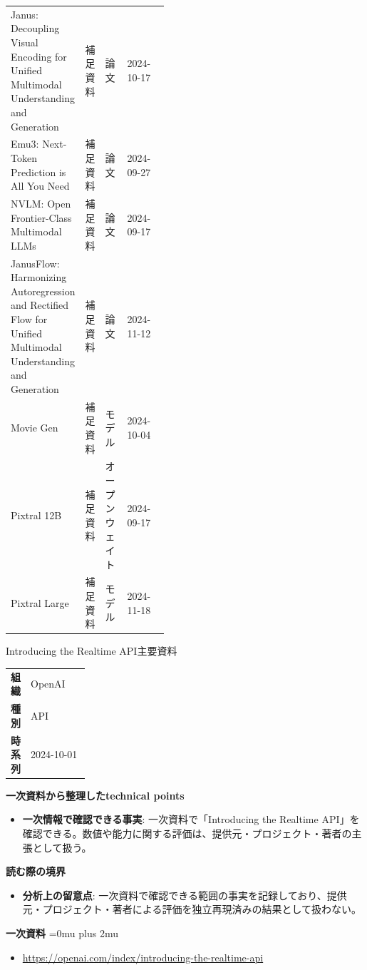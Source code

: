 \begin{center}
\begin{tabularx}{\linewidth}{@{}p{0.20\linewidth}p{0.10\linewidth}p{0.14\linewidth}X@{}}
Janus: Decoupling Visual Encoding for Unified Multimodal Understanding and Generation & 補足資料 & 論文 & 2024-10-17   \\
Emu3: Next-Token Prediction is All You Need & 補足資料 & 論文 & 2024-09-27   \\
NVLM: Open Frontier-Class Multimodal LLMs & 補足資料 & 論文 & 2024-09-17   \\
JanusFlow: Harmonizing Autoregression and Rectified Flow for Unified Multimodal Understanding and Generation & 補足資料 & 論文 & 2024-11-12   \\
Movie Gen & 補足資料 & モデル & 2024-10-04   \\
Pixtral 12B & 補足資料 & オープンウェイト & 2024-09-17   \\
Pixtral Large & 補足資料 & モデル & 2024-11-18   \\
\bottomrule
\end{tabularx}
\end{center}
\normalsize

\begin{technicalnote}{Introducing the Realtime API}{主要資料}
\begingroup
\begin{tabularx}{\linewidth}{@{}>{\bfseries}p{0.22\linewidth}X@{}}
組織 & OpenAI \\
種別 & API \\
時系列 & 2024-10-01 \\
\end{tabularx}
\smallskip
{\bfseries 一次資料から整理したtechnical points}
\begin{itemize}[leftmargin=1.5em,itemsep=0.35em]
\item \textbf{一次情報で確認できる事実}: 一次資料で「Introducing the Realtime API」を確認できる。数値や能力に関する評価は、提供元・プロジェクト・著者の主張として扱う。
\end{itemize}
\begin{minipage}{\linewidth}
{\bfseries 読む際の境界}
\begin{itemize}[leftmargin=1.5em,itemsep=0.35em]
\item \textbf{分析上の留意点}: 一次資料で確認できる範囲の事実を記録しており、提供元・プロジェクト・著者による評価を独立再現済みの結果として扱わない。
\end{itemize}
\begin{samepage}
{\bfseries 一次資料}
\begingroup\sloppy
\Urlmuskip=0mu plus 2mu\relax
\begin{itemize}[leftmargin=1.5em,itemsep=0.25em]
\item {\scriptsize\url{https://openai.com/index/introducing-the-realtime-api}}
\end{itemize}
\endgroup
\end{samepage}
\end{minipage}
\endgroup
\end{technicalnote}
\medskip

